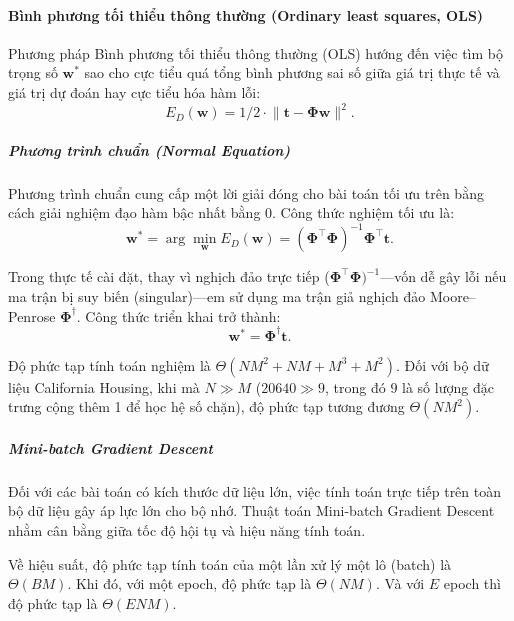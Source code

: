\paragraph{Bình phương tối thiểu thông thường (Ordinary least squares,
OLS)}

Phương pháp Bình phương tối thiểu thông thường (OLS) hướng đến việc tìm bộ
trọng số $\boldsymbol{w}^\ast$ sao cho cực tiểu quá tổng bình phương sai số
giữa giá trị thực tế và giá trị dự đoán hay cực tiểu hóa hàm lỗi:
\begin{equation}
  E_D(\boldsymbol{w}) = 1/2\cdot\lVert \boldsymbol{t} -
  \boldsymbol{\Phi}\boldsymbol{w}\rVert^2.
\end{equation}

\subparagraph{Phương trình chuẩn (Normal Equation)}

Phương trình chuẩn cung cấp một lời giải đóng cho bài toán tối ưu trên bằng
cách giải nghiệm đạo hàm bậc nhất bằng 0. Công thức nghiệm tối ưu là:
\begin{equation}
  \boldsymbol{w}^\ast = \arg\min_{\boldsymbol{w}}E_D(\boldsymbol{w}) =
  (\boldsymbol{\Phi}^\intercal\boldsymbol{\Phi})^{-1}
  \boldsymbol{\Phi}^\intercal\boldsymbol{t}.
\end{equation}

Trong thực tế cài đặt, thay vì nghịch đảo trực tiếp
($\boldsymbol{\Phi}^\intercal\boldsymbol{\Phi})^{-1}$---vốn dễ gây lỗi nếu
ma trận bị suy biến (singular)---em sử dụng ma trận giả nghịch đảo
Moore--Penrose $\boldsymbol{\Phi}^\dagger$. Công thức triển khai trở thành:
\begin{equation}
\boldsymbol{w}^\ast = \boldsymbol{\Phi}^\dagger \boldsymbol{t}.
\end{equation}

Độ phức tạp tính toán nghiệm là $\Theta(NM^2 + NM + M^3 + M^2)$. Đối với bộ dữ
liệu California Housing, khi mà $N \gg M$ ($20640 \gg 9$, trong đó $9$ là số
lượng đặc trưng cộng thêm 1 để học hệ số chặn), độ phức tạp tương
đương $\Theta(NM^2)$.

\subparagraph{Mini-batch Gradient Descent}

Đối với các bài toán có kích thước dữ liệu lớn, việc tính toán trực tiếp trên
toàn bộ dữ liệu gây áp lực lớn cho bộ nhớ. Thuật toán Mini-batch
Gradient Descent nhằm cân bằng giữa tốc độ hội tụ và hiệu năng tính toán.

Về hiệu suất, độ phức tạp tính toán của một lần xử lý một lô (batch) là
$\Theta(BM)$. Khi đó, với một epoch, độ phức tạp là $\Theta(NM)$. Và với $E$
epoch thì độ phức tạp là $\Theta(ENM)$.

